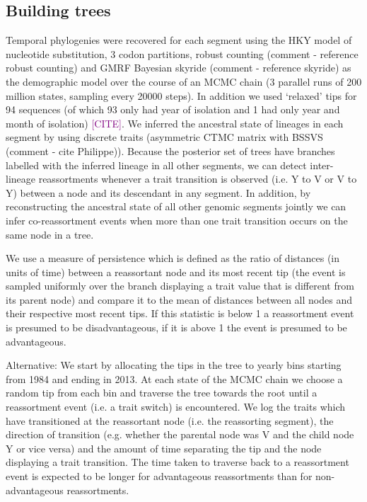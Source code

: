 \documentclass[11pt,oneside,letterpaper]{article}
\def\tbc#1{\textcolor{purple}{[#1]}}
\begin{document}
\subsection*{Building trees}
Temporal phylogenies were recovered for each segment using the HKY model of nucleotide substitution, 3 codon partitions, robust counting (comment - reference robust counting) and GMRF Bayesian skyride (comment - reference skyride) as the demographic model over the course of an MCMC chain (3 parallel runs of 200 million states, sampling every 20000 steps).
In addition we used `relaxed' tips for 94 sequences (of which 93 only had year of isolation and 1 had only year and month of isolation) \tbc{CITE}.
We inferred the ancestral state of lineages in each segment by using discrete traits (asymmetric CTMC matrix with BSSVS (comment - cite Philippe)). Because the posterior set of trees have branches labelled with the inferred lineage in all other segments, we can detect inter-lineage reassortments whenever a trait transition is observed (i.e. Y to V or V to Y) between a node and its descendant in any segment. 
In addition, by reconstructing the ancestral state of all other genomic segments jointly we can infer co-reassortment events when more than one trait transition occurs on the same node in a tree.

We use a measure of persistence which is defined as the ratio of distances (in units of time) between a reassortant node and its most recent tip (the event is sampled uniformly over the branch displaying a trait value that is different from its parent node) and compare it to the mean of distances between all nodes and their respective most recent tips. 
If this statistic is below 1 a reassortment event is presumed to be disadvantageous, if it is above 1 the event is presumed to be advantageous.

Alternative:
We start by allocating the tips in the tree to yearly bins starting from 1984 and ending in 2013. 
At each state of the MCMC chain we choose a random tip from each bin and traverse the tree towards the root until a reassortment event (i.e. a trait switch) is encountered.
We log the traits which have transitioned at the reassortant node (i.e. the reassorting segment), the direction of transition (e.g. whether the parental node was V and the child node Y or vice versa) and the amount of time separating the tip and the node displaying a trait transition. 
The time taken to traverse back to a reassortment event is expected to be longer for advantageous reassortments than for non-advantageous reassortments.
\end{document}
